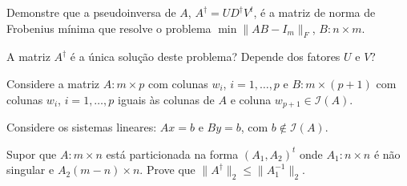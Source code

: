 \begin{questions}
    \question Demonstre que a pseudoinversa de $A$, $A^\dagger = U D^\dagger V^t$, \'{e} a matriz de norma de Frobenius m\'{i}nima que resolve o problema $\min \| A B - I_m \|_F$, $B : n \times m$.

    A matriz $A^\dagger$ \'{e} a \'{u}nica solu\c{c}\~{a}o deste problema? Depende dos fatores $U$ e $V$?

    \begin{solution}
    \end{solution}

    \question Considere a matriz $A : m \times p$ com colunas $w_i$, $i = 1, \ldots, p$ e $B : m \times (p + 1)$ com colunas $w_i$, $i = 1, \ldots, p$ iguais \`{a}s colunas de $A$ e coluna $w_{p + 1} \in \mathcal{I}(A)$.

    Considere os sistemas lineares: $A x = b$ e $B y = b$, com $b \not\in \mathcal{I}(A)$.

    \question Supor que $A : m \times n$ est\'{a} particionada na forma $(A_1 , A_2)^t$ onde $A_1 : n \times n$ \'{e} n\~{a}o singular e $A_2 (m - n) \times n$. Prove que $\| A^\dagger \|_2 \leq \| A_1^{-1} \|_2$.
    \begin{solution}
    \end{solution}
\end{questions}
